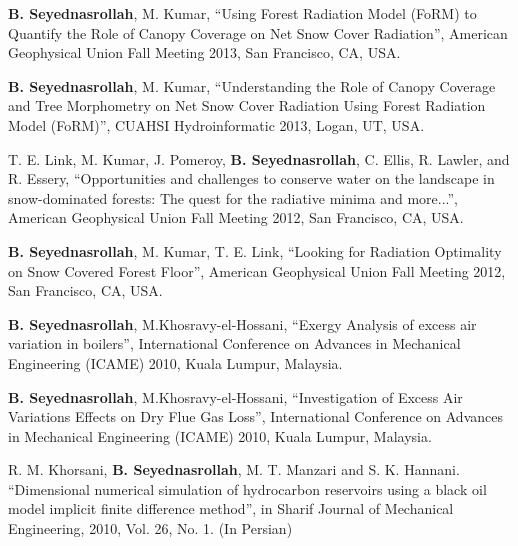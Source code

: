 \documentclass[10pt]{article}
\newenvironment{changemargin}[2]{%
  \begin{list}{}{%
 \setlength{\topsep}{0pt}%
 \setlength{\leftmargin}{#1}%
 \setlength{\rightmargin}{#2}%
 \setlength{\listparindent}{\parindent}%
 \setlength{\itemindent}{\parindent}%
 \setlength{\parsep}{\parskip}%
  }%
  \item[]}{\end{list}
}
\newenvironment{body} {
  \vspace*{-2pt}
  \begin{changemargin}{-0.5in}{-0.5in}
}
{\end{changemargin}
}
\begin{document}
\begin{body}
\begin{etaremune}
    \item \textbf{B. Seyednasrollah}, M. Kumar, ``Using Forest Radiation Model (FoRM) to Quantify the Role of Canopy Coverage on Net Snow Cover Radiation'', American Geophysical Union Fall Meeting 2013, San Francisco, CA, USA.\\
    \medskip

    \item \textbf{B. Seyednasrollah}, M. Kumar, ``Understanding the Role of Canopy Coverage and Tree Morphometry on Net Snow Cover Radiation Using Forest Radiation Model (FoRM)'', CUAHSI Hydroinformatic 2013, Logan, UT, USA.\\
    \medskip

    \item T. E. Link, M. Kumar, J. Pomeroy, \textbf{B. Seyednasrollah}, C. Ellis, R. Lawler, and R. Essery, ``Opportunities and challenges to conserve water on the landscape in snow-dominated forests: The quest for the radiative minima and more...'', American Geophysical Union Fall Meeting 2012, San Francisco, CA, USA.\\
    \medskip

    \item \textbf{B. Seyednasrollah}, M. Kumar, T. E. Link, ``Looking for Radiation Optimality on Snow Covered Forest Floor'', American Geophysical Union Fall Meeting 2012, San Francisco, CA, USA.\\
    \medskip

    \item \textbf{B. Seyednasrollah}, M.Khosravy-el-Hossani, ``Exergy Analysis of excess air variation in boilers'', International Conference on Advances in Mechanical Engineering (ICAME) 2010, Kuala Lumpur, Malaysia.\\
    \medskip

    \item \textbf{B. Seyednasrollah}, M.Khosravy-el-Hossani, ``Investigation of Excess Air Variations Effects on Dry Flue Gas Loss'', International Conference on Advances in Mechanical Engineering (ICAME) 2010, Kuala Lumpur, Malaysia.\\
    \medskip

    \item  R. M. Khorsani, \textbf{B. Seyednasrollah}, M. T. Manzari and S. K. Hannani. ``Dimensional numerical simulation of hydrocarbon reservoirs using a black oil model implicit finite difference method'', in Sharif Journal of Mechanical Engineering, 2010, Vol. 26, No. 1. (In Persian)\\
    \medskip


\end{etaremune}
\end{body}
\end{document}
